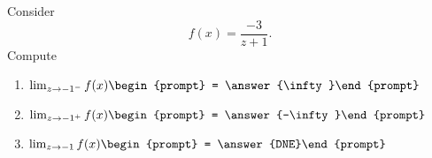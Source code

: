 \documentclass{ximera}
\author{Bart Snapp}
\begin{document}
\begin{exercise}
Consider 
\[
f(x) = \frac{-3}{z+1}.
\]
Compute
\begin{enumerate}
\item $\lim_{z\to -1^- } f(x) \begin{prompt} = \answer{\infty}\end{prompt}$
\item $\lim_{z\to -1^+ } f(x) \begin{prompt} = \answer{-\infty}\end{prompt}$
\item $\lim_{z\to -1 } f(x) \begin{prompt} = \answer{DNE}\end{prompt}$
\end{enumerate}
\end{exercise}
\end{document}
